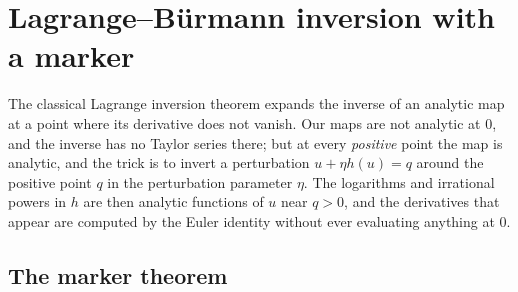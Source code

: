 \section{Lagrange--B\"urmann inversion with a marker}
\label{sec:lagrange}

The classical Lagrange inversion theorem expands the inverse of an analytic map at a point where its derivative does not vanish. Our maps are not analytic at $0$, and the inverse has no Taylor series there; but at every \emph{positive} point the map is analytic, and the trick is to invert a perturbation $u+\eta h(u)=q$ around the positive point $q$ in the perturbation parameter $\eta$. The logarithms and irrational powers in $h$ are then analytic functions of $u$ near $q>0$, and the derivatives that appear are computed by the Euler identity without ever evaluating anything at $0$.

\subsection{The marker theorem}

